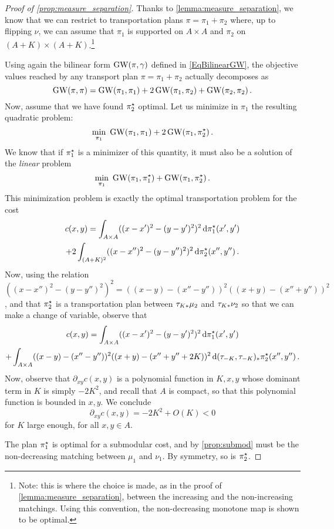             \begin{proof}[Proof of \cref{prop:measure_separation}]
            Thanks to \cref{lemma:measure_separation}, we know that we can restrict to transportation plans $\pi = \pi_1 + \pi_2$ where, up to flipping $\nu$, we can assume that $\pi_1$ is supported on $A \times A$ and $\pi_2$ on $(A+K) \times (A+K)$.\footnote{Note: this is where the choice is made, as in the proof of \cref{lemma:measure_separation}, between the increasing and the non-increasing matchings. Using this convention, the non-decreasing monotone map is shown to be optimal.}

            Using again the bilinear form $\operatorname{GW}(\pi,\gamma)$ defined in \cref{EqBilinearGW},
             the objective values reached by any transport plan $\pi = \pi_1 + \pi_2$ actually decomposes as
            \[ \operatorname{GW}(\pi,\pi) = \operatorname{GW}(\pi_1,\pi_1) + 2\operatorname{GW}(\pi_1,\pi_2) + \operatorname{GW}(\pi_2,\pi_2)\,. \]
            Now, assume that we have found $\pi_2^\star$ optimal. Let us minimize in $\pi_1$ the resulting quadratic problem:
            \[ \min_{\pi_1}\ \operatorname{GW}(\pi_1,\pi_1) + 2\operatorname{GW}(\pi_1,\pi_2^\star)\,. \]
            We know that if $\pi_1^\star$ is a minimizer of this quantity, it must also be a solution of the \emph{linear} problem
            \[ \min_{\pi_1}\ \operatorname{GW}(\pi_1, \pi_1^\star) + \operatorname{GW}(\pi_1,\pi_2^\star)\,.\]
            This minimization problem is exactly the optimal transportation problem for the cost
            \begin{multline*} c(x,y) = \int_{A \times A} ((x-x')^2 - (y-y')^2)^2 \,\mathrm d \pi_1^\star(x',y') \\+ 2 \int_{(A+K)^2} ((x-x'')^2 - (y-y'')^2)^2 \,\mathrm d \pi_2^\star(x'',y'') \,.
            \end{multline*}
            Now, using the relation $((x-x'')^2 - (y-y'')^2)^2 = ((x-y)-(x''-y''))^2 ((x+y) - (x''+y''))^2$, and that $\pi_2^\star$ is a transportation plan between $\tau_{K*}\mu_2$ and $\tau_{K*} \nu_2$ so that we can make a change of variable, observe that
            \begin{multline*} c(x,y) = \int_{A\times A} ((x-x')^2 - (y-y')^2)^2 \,\mathrm d \pi_1^\star(x',y') \\+ \int_{A \times A} ((x-y)-(x''-y''))^2 ((x+y) - (x'' + y'' +2K))^2 \,\mathrm d (\tau_{-K},\tau_{-K})_*\pi_2^\star(x'',y'')\,.
            \end{multline*}
            Now, observe that $\partial_{xy} c(x,y)$ is a polynomial function in $K,x,y$ whose dominant term in $K$ is simply $-2K^2$, and recall that $A$ is compact, so that this polynomial function is bounded in $x,y$. We conclude
            \[ \partial_{xy} c(x,y) = -2 K^2 + O(K) < 0 \]
            for $K$ large enough, for all $x,y \in A$.

            The plan $\pi_1^\star$ is optimal for a submodular cost, and by \cref{prop:submod} must be the non-decreasing matching between $\mu_1$ and $\nu_1$. By symmetry, so is $\pi_2^\star$.
            \end{proof}


